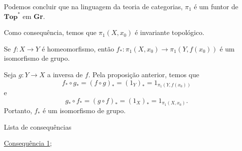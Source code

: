 Podemos concluir que na linguagem da teoria de categorias, $\pi_1$ é um funtor de $\textbf{Top}^*$ em \textbf{Gr}. 

Como consequência, temos que $\pi_1(X,x_0)$ é invariante topológico.

\begin{corol}
    Se $f:X\rightarrow Y$ é homeomorfismo, então $f_*:\pi_1 (X,x_0)\rightarrow \pi_1(Y,f(x_0))$ é um isomorfismo de grupo.
\end{corol}

\begin{dem}
    Seja $g:Y\rightarrow X$ a inversa de $f.$ Pela proposição anterior, temos que 
    $$f_*\circ g_*=(f\circ g)_*=(1_Y)_*=1_{\pi_1(Y,f(x_0))}$$
    e 
    $$g_*\circ f_*=(g\circ f)_*=(1_X)_*=1_{\pi_1 (X,x_0)}.$$
    Portanto, $f_*$ é um isomorfismo de grupo.
\end{dem}

\begin{titlemize}{Lista de consequências}
	\item \hyperref[consequencia1]{Consequência 1};\\ %
	\item \hyperref[]{}
\end{titlemize}

